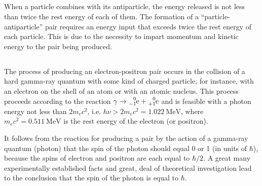 \subsection{}\label{43.5.3} When a particle combines with its antiparticle, the energy released is not less than twice the rest energy of each of them. The formation of a ``particle-antiparticle'' pair requires an energy input that exceeds twice the rest energy of each particle. This is due to the necessity to impart momentum and kinetic energy to the pair being produced.

\subsection{}\label{43.5.4} The process of producing an electron-positron pair occurs in the collision of a hard gamma-ray quantum with some kind of charged particle, for instance, with an electron on the shell of an atom or with an atomic nucleus. This process proceeds
according to the reaction $\gamma \to  \ce{^{0}_{-1}e} +\ce{^{0}_{+1}e}$ and is feasible with a photon energy not less than $2m_{e}c^{2}$, i.e. $h\nu > 2m_{e}c^{2} = \SI{1.022}{\MeV}$, where $m_{e}c^{2} = \SI{0.511}{\MeV}$ is the rest energy of the electron (or positron). 

It follows from the reaction for producing a pair by the action of a gamma-ray quantum (photon) that the spin of the photon should equal 0 or 1 (in units of $\hbar$), because the spins of electron and positron are each equal to $\hbar/2$. A great many experimentally established facts and great, deal of theoretical investigation lead to the conclusion that the spin of the photon is equal to $\hbar$.


